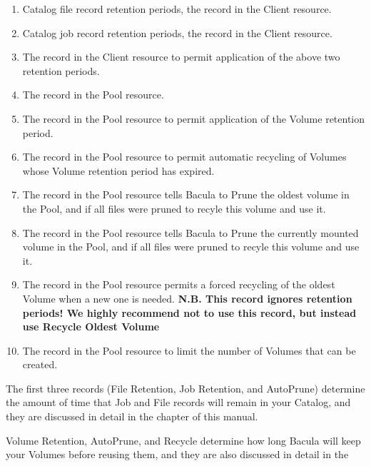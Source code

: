 \begin{enumerate}
\item Catalog file record retention periods, the  
     record in the Client
   resource.  
\item Catalog job record retention periods, the  
     record in the Client
   resource.  
\item The 
    record in the Client resource
   to permit  application of the above two retention periods.  
\item The 
    record in the Pool
   resource.  
\item The 
    record in the Pool
   resource to permit  application of the Volume retention period.  
\item The 
    record in the Pool resource
   to permit  automatic recycling of Volumes whose Volume retention period has 
expired.  
\item The 
    record in the
   Pool resource tells Bacula  to Prune the oldest volume in the Pool, and if all
files  were pruned to recyle this volume and use it.  
\item The 
    record in
   the Pool resource tells Bacula  to Prune the currently mounted volume in the
Pool, and if all files  were pruned to recyle this volume and use it.  
\item The 
    record in the
   Pool resource  permits a forced recycling of the oldest Volume when a new one
is  needed.  {\bf N.B. This record ignores retention periods! We highly
recommend  not to use this record, but instead use Recycle Oldest Volume}  
\item The 
    record in the Pool
   resource to limit  the number of Volumes that can be created. 
\end{enumerate}

The first three records (File Retention, Job Retention, and AutoPrune)
determine the amount of time that Job and File records will remain in your
Catalog, and they are discussed in detail in the 
 chapter of
this manual. 

Volume Retention, AutoPrune, and Recycle determine how long Bacula will keep
your Volumes before reusing them, and they are also discussed in detail in the

